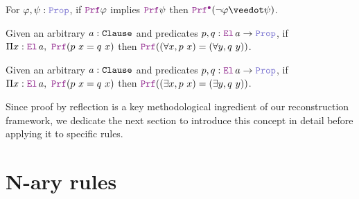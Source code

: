 \begin{lemma}[$\kw{subproof}_1$]\label{lem:subproof}
For $\varphi, \psi : \prop{}$, if $\prf{} \varphi$ implies $\prf{} \psi$ then $\pid (\neg \varphi \veedot \psi)$.
\end{lemma}


\begin{lemma}\label{lem:bind-forall}
Given an arbitrary $a : \texttt{\upshape{Clause}}$ and predicates $p, q : \el{}\,a \ra \prop$, if $\Pi x : \el{}\,a,~ \prf (p~x = q~x)$ then $\prf ((\forall x, p~x) = (\forall y, q~y))$.
\end{lemma}


\begin{lemma}\label{lem:bind-exists}
  Given an arbitrary $a : \texttt{\upshape{Clause}}$ and predicates $p, q : \el{}\,a \ra \prop$, if $\Pi x : \el{}\,a,~ \prf (p~x = q~x)$ then $\prf ((\exists x, p~x) = (\exists y, q~y))$.
\end{lemma}



Since proof by reflection is a key methodological ingredient of our reconstruction framework, 
we dedicate the next section to introduce this concept in detail before applying it to specific rules.




\section{N-ary rules}
\label{sec:nary-rule-recon}

